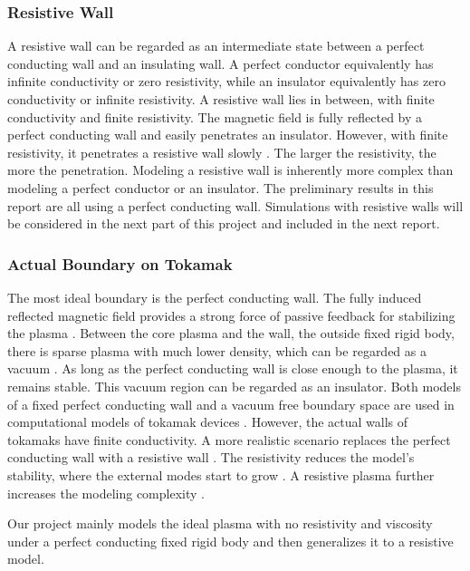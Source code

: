\subsubsection{Resistive Wall}
A resistive wall can be regarded as an intermediate state between a perfect conducting wall and an insulating wall. A perfect conductor equivalently has infinite conductivity or zero resistivity, while an insulator equivalently has zero conductivity or infinite resistivity. A resistive wall lies in between, with finite conductivity and finite resistivity. The magnetic field is fully reflected by a perfect conducting wall and easily penetrates an insulator. However, with finite resistivity, it penetrates a resistive wall slowly \cite{bondeson2003physics}. The larger the resistivity, the more the penetration. Modeling a resistive wall is inherently more complex than modeling a perfect conductor or an insulator. The preliminary results in this report are all using a perfect conducting wall. Simulations with resistive walls will be considered in the next part of this project and included in the next report.
\subsubsection{Actual Boundary on Tokamak}
The most ideal boundary is the perfect conducting wall. The fully induced reflected magnetic field provides a strong force of passive feedback for stabilizing the plasma \cite{takeda1991computation,clauser2021iter,bondeson2003physics,yolbarsop2022analytic,bondeson1994stabilization}. Between the core plasma and the wall, the outside fixed rigid body, there is sparse plasma with much lower density, which can be regarded as a vacuum \cite{clauser2021iter,takeda1991computation}. As long as the perfect conducting wall is close enough to the plasma, it remains stable. This vacuum region can be regarded as an insulator. Both models of a fixed perfect conducting wall and a vacuum free boundary space are used in computational models of tokamak devices \cite{clauser2021iter,freidberg2014ideal}. However, the actual walls of tokamaks have finite conductivity. A more realistic scenario replaces the perfect conducting wall with a resistive wall \cite{clauser2021iter}. The resistivity reduces the model's stability, where the external modes start to grow \cite{haney1989variational,bondeson2003physics,bondeson1994stabilization}. A resistive plasma further increases the modeling complexity \cite{yolbarsop2022analytic}.

Our project mainly models the ideal plasma with no resistivity and viscosity under a perfect conducting fixed rigid body and then generalizes it to a resistive model.